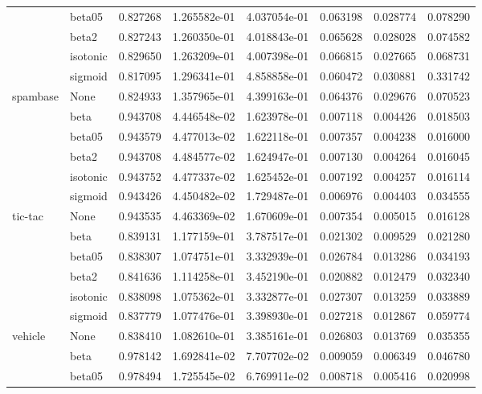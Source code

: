 \begin{tabular}{llrrrrrr}
        & beta05 &  0.827268 &  1.265582e-01 &  4.037054e-01 &  0.063198 &  0.028774 &  0.078290 \\
        & beta2 &  0.827243 &  1.260350e-01 &  4.018843e-01 &  0.065628 &  0.028028 &  0.074582 \\
        & isotonic &  0.829650 &  1.263209e-01 &  4.007398e-01 &  0.066815 &  0.027665 &  0.068731 \\
        & sigmoid &  0.817095 &  1.296341e-01 &  4.858858e-01 &  0.060472 &  0.030881 &  0.331742 \\
spambase & None &  0.824933 &  1.357965e-01 &  4.399163e-01 &  0.064376 &  0.029676 &  0.070523 \\
        & beta &  0.943708 &  4.446548e-02 &  1.623978e-01 &  0.007118 &  0.004426 &  0.018503 \\
        & beta05 &  0.943579 &  4.477013e-02 &  1.622118e-01 &  0.007357 &  0.004238 &  0.016000 \\
        & beta2 &  0.943708 &  4.484577e-02 &  1.624947e-01 &  0.007130 &  0.004264 &  0.016045 \\
        & isotonic &  0.943752 &  4.477337e-02 &  1.625452e-01 &  0.007192 &  0.004257 &  0.016114 \\
        & sigmoid &  0.943426 &  4.450482e-02 &  1.729487e-01 &  0.006976 &  0.004403 &  0.034555 \\
tic-tac & None &  0.943535 &  4.463369e-02 &  1.670609e-01 &  0.007354 &  0.005015 &  0.016128 \\
        & beta &  0.839131 &  1.177159e-01 &  3.787517e-01 &  0.021302 &  0.009529 &  0.021280 \\
        & beta05 &  0.838307 &  1.074751e-01 &  3.332939e-01 &  0.026784 &  0.013286 &  0.034193 \\
        & beta2 &  0.841636 &  1.114258e-01 &  3.452190e-01 &  0.020882 &  0.012479 &  0.032340 \\
        & isotonic &  0.838098 &  1.075362e-01 &  3.332877e-01 &  0.027307 &  0.013259 &  0.033889 \\
        & sigmoid &  0.837779 &  1.077476e-01 &  3.398930e-01 &  0.027218 &  0.012867 &  0.059774 \\
vehicle & None &  0.838410 &  1.082610e-01 &  3.385161e-01 &  0.026803 &  0.013769 &  0.035355 \\
        & beta &  0.978142 &  1.692841e-02 &  7.707702e-02 &  0.009059 &  0.006349 &  0.046780 \\
        & beta05 &  0.978494 &  1.725545e-02 &  6.769911e-02 &  0.008718 &  0.005416 &  0.020998 \\

\end{tabular}
